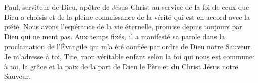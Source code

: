 Paul, serviteur de Dieu,
	apôtre de Jésus Christ au service de la foi de ceux que Dieu a choisis
	et de la pleine connaissance de la vérité qui est en accord avec la piété.
Nous avons l’espérance de la vie éternelle,
	promise depuis toujours par Dieu qui ne ment pas.
Aux temps fixés, il a manifesté sa parole dans la proclamation de l’Évangile
	qui m’a été confiée par ordre de Dieu notre Sauveur.
Je m’adresse à toi, Tite, mon véritable enfant selon la foi qui nous est commune:
	à toi, la grâce et la paix
	de la part de Dieu le Père et du Christ Jésus notre Sauveur.
